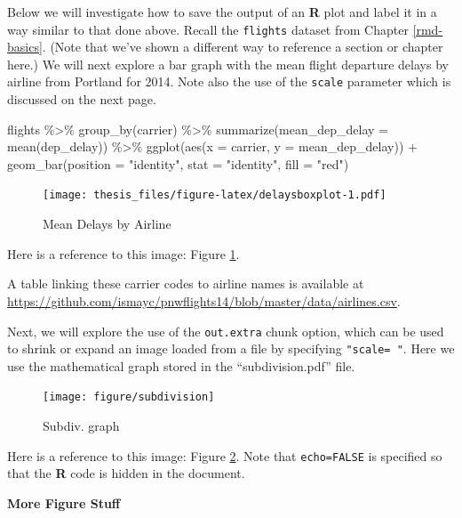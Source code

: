 \documentclass [11pt, proquest] {uwthesis}[2015/03/03]
\newenvironment{Shaded}{\begin{snugshade}}{\end{snugshade}}
\newcommand{\AttributeTok}[1]{\textcolor[rgb]{0.77,0.63,0.00}{#1}}
\newcommand{\FunctionTok}[1]{\textcolor[rgb]{0.00,0.00,0.00}{#1}}
\newcommand{\NormalTok}[1]{#1}
\newcommand{\SpecialCharTok}[1]{\textcolor[rgb]{0.00,0.00,0.00}{#1}}
\newcommand{\StringTok}[1]{\textcolor[rgb]{0.31,0.60,0.02}{#1}}
\begin{document}
Below we will investigate how to save the output of an \textbf{R} plot and label it in a way similar to that done above. Recall the \texttt{flights} dataset from Chapter \ref{rmd-basics}. (Note that we've shown a different way to reference a section or chapter here.) We will next explore a bar graph with the mean flight departure delays by airline from Portland for 2014. Note also the use of the \texttt{scale} parameter which is discussed on the next page.
\begin{Shaded}
\begin{Highlighting}[]
\NormalTok{flights }\SpecialCharTok{\%\textgreater{}\%} \FunctionTok{group\_by}\NormalTok{(carrier) }\SpecialCharTok{\%\textgreater{}\%}
  \FunctionTok{summarize}\NormalTok{(}\AttributeTok{mean\_dep\_delay =} \FunctionTok{mean}\NormalTok{(dep\_delay)) }\SpecialCharTok{\%\textgreater{}\%}
  \FunctionTok{ggplot}\NormalTok{(}\FunctionTok{aes}\NormalTok{(}\AttributeTok{x =}\NormalTok{ carrier, }\AttributeTok{y =}\NormalTok{ mean\_dep\_delay)) }\SpecialCharTok{+}
  \FunctionTok{geom\_bar}\NormalTok{(}\AttributeTok{position =} \StringTok{"identity"}\NormalTok{, }\AttributeTok{stat =} \StringTok{"identity"}\NormalTok{, }\AttributeTok{fill =} \StringTok{"red"}\NormalTok{)}
\end{Highlighting}
\end{Shaded}
\begin{figure}
\centering
\texttt{[image: thesis\_files/figure-latex/delaysboxplot-1.pdf]}
\caption{\label{fig:delaysboxplot}Mean Delays by Airline}
\end{figure}
Here is a reference to this image: Figure \ref{fig:delaysboxplot}.

A table linking these carrier codes to airline names is available at \url{https://github.com/ismayc/pnwflights14/blob/master/data/airlines.csv}.

\clearpage

Next, we will explore the use of the \texttt{out.extra} chunk option, which can be used to shrink or expand an image loaded from a file by specifying \texttt{"scale=\ "}. Here we use the mathematical graph stored in the ``subdivision.pdf'' file.
\begin{figure}
\texttt{[image: figure/subdivision]} \caption{Subdiv. graph}\label{fig:subd}
\end{figure}
Here is a reference to this image: Figure \ref{fig:subd}. Note that \texttt{echo=FALSE} is specified so that the \textbf{R} code is hidden in the document.

\textbf{More Figure Stuff}
\end{document}
